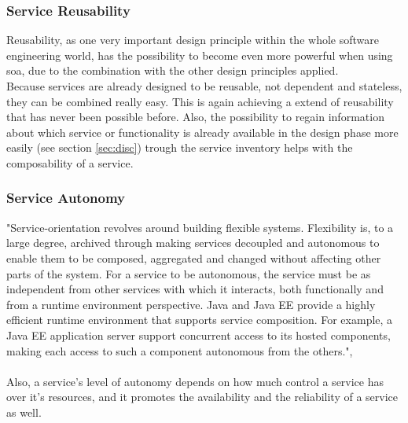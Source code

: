 \documentclass[12pt]{article}
\begin{document}
\subsubsection{Service Reusability}
Reusability, as one very important design principle within the whole software engineering world, has the possibility to become even more powerful when using \gls{soa}, due to the combination with the other design principles applied. \\  Because services are already designed to be reusable, not dependent and stateless, they can be combined really easy. This is again achieving a extend of reusability that has never been possible before. Also, the possibility to regain information about which service or functionality is already available in the design phase more easily (see section \ref{sec:disc}) trough the service inventory helps with the composability of a service. \cite[page 87-88]{te}
\subsubsection{Service Autonomy}
"Service-orientation revolves around building flexible systems. Flexibility is, to a large degree, archived through making services decoupled and autonomous to enable them to be composed, aggregated and changed without affecting other parts of the system. For a service to be autonomous, the service must be as independent from other services with which it interacts, both functionally and from a runtime environment perspective. Java and Java EE provide a highly efficient runtime environment that supports service composition. For example, a Java EE application server support concurrent access to its hosted components, making each access to such a component autonomous from the others.", \cite[page 194]{grau}\\\\
Also, a service's level of autonomy depends on how much control a service has over it's resources, and it promotes the availability and the reliability of a service as well. \cite[page 88]{te}
\end{document}
